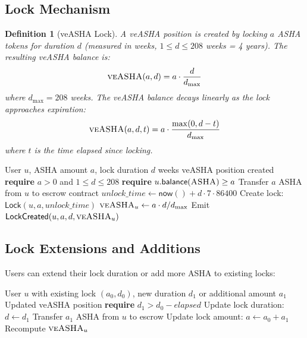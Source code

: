 \documentclass[11pt,a4paper]{article}
\newcommand{\veasha}{\textsc{veASHA}\xspace}
\newcommand{\asha}{\textsc{ASHA}\xspace}
\newtheorem{definition}{Definition}
\begin{document}
\subsection{Lock Mechanism}

\begin{definition}[veASHA Lock]
A veASHA position is created by locking $a$ ASHA tokens for duration $d$ (measured in weeks, $1 \leq d \leq 208$ weeks = 4 years). The resulting veASHA balance is:
\begin{equation}
    \veasha(a, d) = a \cdot \frac{d}{d_{\max}}
\end{equation}
where $d_{\max} = 208$ weeks. The veASHA balance decays linearly as the lock approaches expiration:
\begin{equation}
    \veasha(a, d, t) = a \cdot \frac{\max(0, d - t)}{d_{\max}}
\end{equation}
where $t$ is the time elapsed since locking.
\end{definition}

\begin{algorithm}[H]
\caption{veASHA Lock Creation}
\label{alg:lock}
\begin{algorithmic}[1]
\Require User $u$, ASHA amount $a$, lock duration $d$ weeks
\Ensure veASHA position created
\State \textbf{require} $a > 0$ and $1 \leq d \leq 208$
\State \textbf{require} $u.\mathsf{balance}(\asha) \geq a$
\State Transfer $a$ ASHA from $u$ to escrow contract
\State $\mathit{unlock\_time} \leftarrow \mathsf{now}() + d \cdot 7 \cdot 86400$
\State Create lock: $\mathsf{Lock}(u, a, \mathit{unlock\_time})$
\State $\veasha_u \leftarrow a \cdot d / d_{\max}$
\State Emit $\mathsf{LockCreated}(u, a, d, \veasha_u)$
\end{algorithmic}
\end{algorithm}

\subsection{Lock Extensions and Additions}

Users can extend their lock duration or add more ASHA to existing locks:

\begin{algorithm}[H]
\caption{veASHA Lock Extension}
\label{alg:extend}
\begin{algorithmic}[1]
\Require User $u$ with existing lock $(a_0, d_0)$, new duration $d_1$ or additional amount $a_1$
\Ensure Updated veASHA position
    \State \textbf{require} $d_1 > d_0 - \mathit{elapsed}$
    \State Update lock duration: $d \leftarrow d_1$
\EndIf
{}
    \State Transfer $a_1$ ASHA from $u$ to escrow
    \State Update lock amount: $a \leftarrow a_0 + a_1$
\EndIf
\State Recompute $\veasha_u$
\end{algorithmic}
\end{algorithm}
\end{document}
